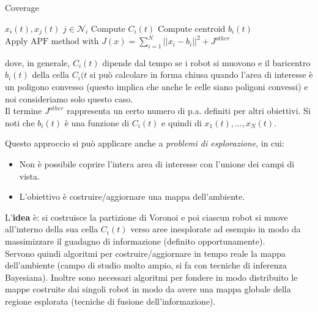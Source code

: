 \begin{algorithm}
\caption{Coverage}
\begin{algorithmic}
\REQUIRE $x_i(t), x_j(t)$
\ENSURE $j \in \mathcal{N}_i$
\STATE $\text{Compute } C_i(t)$
\STATE $\text{Compute centroid } b_i(t)$
\STATE $\text{Apply APF method with } J(x) = \sum_{i=1}^N ||x_i - b_i||^2 + J^{other}$
\ENDFOR
\ENDFOR
\end{algorithmic}
\end{algorithm}

dove, in generale, $C_i(t)$ dipende dal tempo se i robot si muovono e il baricentro $b_i(t)$ della cella $C_i(t$ si pu\`o calcolare in forma chiusa quando l'area di interesse \`e un poligono convesso (questo implica che anche le celle siano poligoni convessi) e noi consideriamo solo questo caso.\\
Il termine $J^{other}$ rappresenta un certo numero di p.a. definiti per altri obiettivi. Si noti che $b_i(t)$ \`e una funzione di $C_i(t)$ e quindi di $x_1(t), \dots, x_N(t)$.

\begin{center}
\end{center}
Questo approccio si pu\`o applicare anche a \textit{problemi di esplorazione}, in cui:
\begin{itemize}
\item Non \`e possibile coprire l'intera area di interesse con l'unione dei campi di vista.
\item L'obiettivo \`e costruire/aggiornare una mappa dell'ambiente.
\end{itemize}
L'\textbf{idea} \`e: si costruisce la partizione di Voronoi e poi ciascun robot si muove all'interno della sua cella $C_i(t)$ verso aree inesplorate ad esempio in modo da massimizzare il guadagno di informazione (definito opportunamente). \\
Servono quindi algoritmi per costruire/aggiornare in tempo reale la mappa dell'ambiente (campo di studio molto ampio, si fa con tecniche di inferenza Bayesiana). Inoltre sono necessari algoritmi per fondere in modo distribuito le mappe costruite dai singoli robot in modo da avere una mappa globale della regione esplorata (tecniche di fusione dell'informazione).


